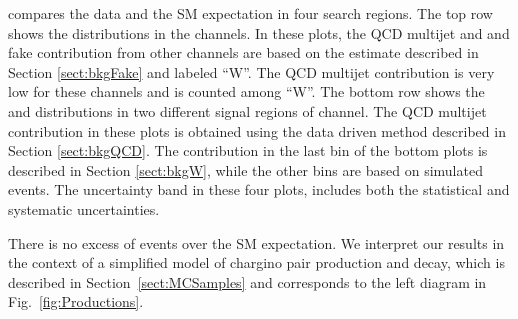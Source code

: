 compares the data and the SM expectation in four search regions. The top row 
shows the \mttwo distributions in the \leptonTau channels. 
In these plots, the QCD multijet and \wjets and fake contribution from other channels 
are based on the estimate described in Section \ref{sect:bkgFake} and labeled ``W''.
The QCD multijet contribution is very low for these channels and is counted among ``W''.
The bottom row shows the \mttwo and \SumMT distributions in two different signal regions of \tauTau channel. 
The QCD multijet contribution in these plots is obtained using the data driven method described in 
Section \ref{sect:bkgQCD}. The \wjets contribution in 
the last bin of the bottom plots is described in Section \ref{sect:bkgW}, while the other bins are based on simulated events.
The uncertainty band in these four plots, includes both the statistical and systematic uncertainties.

There is no excess of events over the SM expectation.  We interpret our results in the context
of a simplified model of chargino pair production and decay, which is described in Section~\ref{sect:MCSamples} and corresponds 
to the left diagram in Fig.~\ref{fig:Productions}. 

